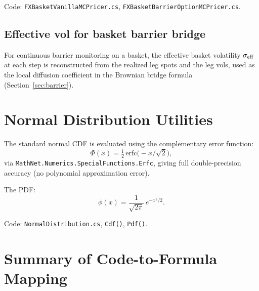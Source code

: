 \documentclass[11pt,a4paper]{article}
\newcommand{\coderef}[1]{\texttt{\color{blue!60!black}#1}}
\theoremstyle{definition}
\begin{document}
Code: \coderef{FXBasketVanillaMCPricer.cs},
\coderef{FXBasketBarrierOptionMCPricer.cs}.

\subsection{Effective vol for basket barrier bridge}

For continuous barrier monitoring on a basket, the effective basket
volatility $\sigma_{\rm eff}$ at each step is reconstructed from the realized
leg spots and the leg vols, used as the local diffusion coefficient in the
Brownian bridge formula (Section~\ref{sec:barrier}).

\section{Normal Distribution Utilities}
\label{sec:normal}

The standard normal CDF is evaluated using the complementary error function:
\[
  \Phi(x) = \tfrac{1}{2}\,\mathrm{erfc}\!\bigl(-x/\sqrt{2}\bigr),
\]
via \texttt{MathNet.Numerics.SpecialFunctions.Erfc}, giving full
double-precision accuracy (no polynomial approximation error).

The PDF:
\[
  \phi(x) = \frac{1}{\sqrt{2\pi}}\,e^{-x^2/2}.
\]

Code: \coderef{NormalDistribution.cs}, \texttt{Cdf()}, \texttt{Pdf()}.

\section{Summary of Code-to-Formula Mapping}
\label{sec:summary}
\end{document}
